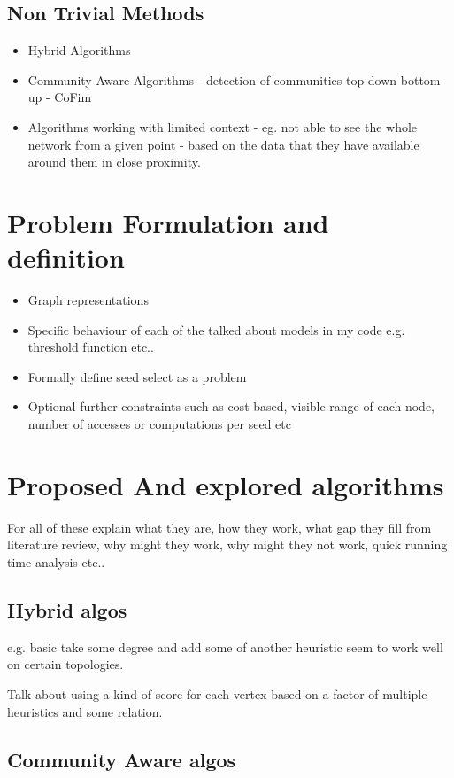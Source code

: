 \documentclass{article}
\begin{document}
\subsection{Non Trivial Methods}
\begin{itemize}
	\item Hybrid Algorithms 
	\item Community Aware Algorithms - detection of communities top down bottom up - CoFim
	\item Algorithms working with limited context - eg. not able to see the whole network from a given point - based on the data that they have available around them in close proximity.
\end{itemize}
\section{Problem Formulation and definition}
\begin{itemize}
	\item Graph representations
	\item Specific behaviour of each of the talked about models in my code e.g. threshold function etc..
	\item Formally define seed select as a problem
	\item Optional further constraints such as cost based, visible range of each node, number of accesses or computations per seed etc
\end{itemize}

\section{Proposed And explored algorithms}

For all of these explain what they are, how they work, what gap they fill from literature review, why might they work, why might they not work, quick running time analysis etc..

\subsection{Hybrid algos}
e.g. basic take some degree and add some of another heuristic seem to work well on certain topologies. 

Talk about using a kind of score for each vertex based on a factor of multiple heuristics and some relation.
\subsection{Community Aware algos}
\end{document}
